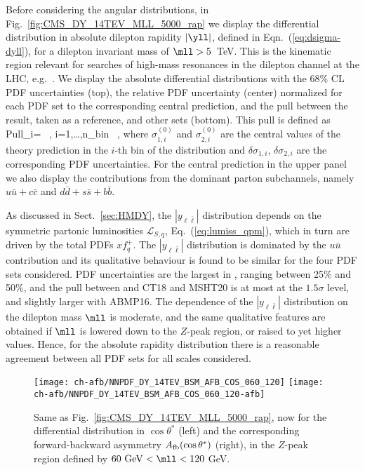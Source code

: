 Before considering the angular distributions, in
Fig.~\ref{fig:CMS_DY_14TEV_MLL_5000_rap} we display the 
differential distribution in absolute dilepton rapidity $|\yll|$,
defined in Eqn.~(\ref{eq:dsigma-dyll}),
for a dilepton invariant mass of $\mll > 5$~TeV.
%
This is the kinematic region relevant for searches of high-mass resonances
in the dilepton channel at the LHC, e.g.~\cite{ATLAS:2019erb,Khachatryan:2016zqb}.
%
We display the absolute differential distributions with the 68\% CL PDF uncertainties
(top), the relative PDF uncertainty (center) normalized for each PDF
set to the corresponding central prediction, and the pull between the
 result, taken as a reference, and other sets (bottom).
%
This pull is    defined as
    \be
\label{eq:pulldef_xsec}
{\rm Pull}_i=  \, , \qquad i=1,\ldots,n_{\rm bin} \, ,
\ee
where  $\sigma^{(0)}_{1,i}$ and $\sigma^{(0)}_{2,i}$ are the central values of the
theory prediction in the $i$-th bin of the distribution and $\delta \sigma_{1,i}$, $\delta \sigma_{2,i}$ are
the corresponding PDF uncertainties.
%
For the central  prediction in the upper panel we also display the
contributions from the dominant parton subchannels, namely
$u\bar{u}+c\bar{c}$ and $d\bar{d}+s\bar{s}+b\bar{b}$.

As discussed in Sect.~\ref{sec:HMDY}, the  $|y_{\ell\bar{\ell}}|$  distribution
depends  on the symmetric partonic luminosities $\mathcal{L}_{S,q}$, Eq.~(\ref{eq:lumiss_qpm}),
which in turn are driven by the total PDFs $xf^+_q$.
%
The $|y_{\ell\bar{\ell}}|$  distribution
is dominated by the $u\bar{u}$
contribution and its qualitative behaviour is found to be similar for the four PDF sets considered.
%
PDF uncertainties are the largest in , ranging between 25\% and 50\%,
and the pull between  and  CT18 and MSHT20 is at most at the
$1.5\sigma$ level, and slightly larger  
with ABMP16.
%
The dependence of the $|y_{\ell\bar{\ell}}|$  distribution on the dilepton mass $\mll$
is moderate, and the same qualitative features are
obtained if $\mll$ is lowered down to the $Z$-peak region, or
raised to yet higher values.
%
Hence, for the absolute rapidity distribution there is a
reasonable agreement between all  PDF sets for all scales considered.

\begin{figure}[t]
\centering
\texttt{[image: ch-afb/NNPDF\_DY\_14TEV\_BSM\_AFB\_COS\_060\_120]}
\texttt{[image: ch-afb/NNPDF\_DY\_14TEV\_BSM\_AFB\_COS\_060\_120-afb]}
\caption{Same as Fig.~\ref{fig:CMS_DY_14TEV_MLL_5000_rap}, now for the differential distribution in
  $\cos\theta^*$ (left)
  and the corresponding forward-backward asymmetry
  $A_{\rm fb}(\cos\theta^*)$ (right), in the $Z$-peak region defined by $60~{\rm GeV} < \mll < 120$ GeV.}
\label{fig:CMS_DY_14TEV_MLL_zpeak}
\end{figure}

